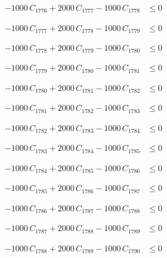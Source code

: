 \documentclass[a4paper,11pt]{article}
\begin{document}
\begin{align}
-1000\,C_{1776} + 2000\,C_{1777} - 1000\,C_{1778} &\leq 0 \nonumber
\end{align}

\begin{align}
-1000\,C_{1777} + 2000\,C_{1778} - 1000\,C_{1779} &\leq 0 \nonumber
\end{align}

\begin{align}
-1000\,C_{1778} + 2000\,C_{1779} - 1000\,C_{1780} &\leq 0 \nonumber
\end{align}

\begin{align}
-1000\,C_{1779} + 2000\,C_{1780} - 1000\,C_{1781} &\leq 0 \nonumber
\end{align}

\begin{align}
-1000\,C_{1780} + 2000\,C_{1781} - 1000\,C_{1782} &\leq 0 \nonumber
\end{align}

\begin{align}
-1000\,C_{1781} + 2000\,C_{1782} - 1000\,C_{1783} &\leq 0 \nonumber
\end{align}

\begin{align}
-1000\,C_{1782} + 2000\,C_{1783} - 1000\,C_{1784} &\leq 0 \nonumber
\end{align}

\begin{align}
-1000\,C_{1783} + 2000\,C_{1784} - 1000\,C_{1785} &\leq 0 \nonumber
\end{align}

\begin{align}
-1000\,C_{1784} + 2000\,C_{1785} - 1000\,C_{1786} &\leq 0 \nonumber
\end{align}

\begin{align}
-1000\,C_{1785} + 2000\,C_{1786} - 1000\,C_{1787} &\leq 0 \nonumber
\end{align}

\begin{align}
-1000\,C_{1786} + 2000\,C_{1787} - 1000\,C_{1788} &\leq 0 \nonumber
\end{align}

\begin{align}
-1000\,C_{1787} + 2000\,C_{1788} - 1000\,C_{1789} &\leq 0 \nonumber
\end{align}

\begin{align}
-1000\,C_{1788} + 2000\,C_{1789} - 1000\,C_{1790} &\leq 0 \nonumber
\end{align}
\end{document}
